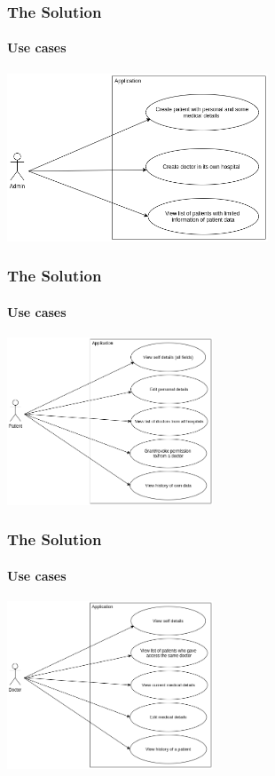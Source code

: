 \documentclass[english,hangout]{beamer}
\begin{document}
\begin{frame}[fragile]
 \frametitle{The Solution}
 \framesubtitle{Use cases}
    \begin{center}
        \vspace{-1.2em}
            \includegraphics[height=5cm]{Admin use case .png}
        \end{center}
        \vspace{-3mm}
\end{frame}

\begin{frame}[fragile]
 \frametitle{The Solution}
 \framesubtitle{Use cases}
    \begin{center}
        \vspace{-1.2em}
            \includegraphics[height=5cm]{Patient use case.png}
        \end{center}
        \vspace{-3mm}
\end{frame}

\begin{frame}[fragile]
 \frametitle{The Solution}
 \framesubtitle{Use cases}
    \begin{center}
        \vspace{-1.2em}
            \includegraphics[height=5cm]{Doctor use case.png}
        \end{center}
        \vspace{-3mm}
\end{frame}
\end{document}

